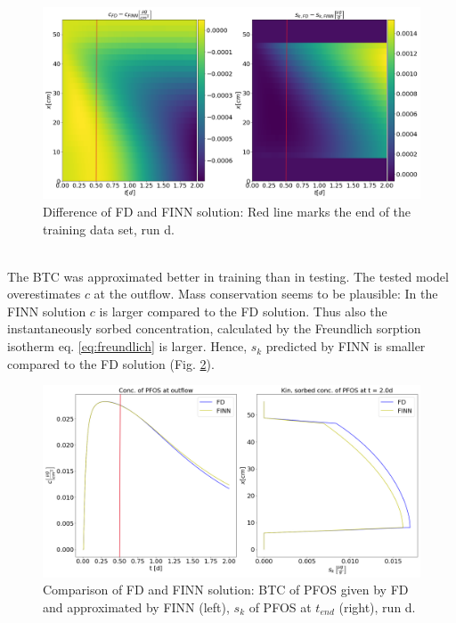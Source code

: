 \begin{figure}[h!]
	\centering
	\includegraphics[width=\textwidth]{images/res_diff_synt_F_m.png}
\caption[Difference of FD and FINN solution, run d]{Difference of FD and FINN solution: Red line marks the end of the training data set, run d.}
\label{fig:res_diff_synt_F_m}
\end{figure}\\
The BTC was approximated better in training than in testing. The tested model overestimates $c$ at the outflow. Mass conservation seems to be plausible: In the FINN solution $c$ is larger compared to the FD solution. Thus also the instantaneously sorbed concentration, calculated by the Freundlich sorption isotherm eq. \ref{eq:freundlich} is larger. Hence, $s_k$ predicted by FINN is smaller compared to the FD solution (Fig. \ref{fig:res_btc_synt_F_m}).
\begin{figure}[h!]
	\centering
	\includegraphics[width=\textwidth]{images/res_btc_synt_F_m.png}
\caption[Comparison of FD and FINN BTC, run d]{Comparison of FD and FINN solution: BTC of PFOS given by FD and approximated by FINN (left), $s_k$ of PFOS at $t_{end}$ (right), run d.}
\label{fig:res_btc_synt_F_m}
\end{figure}\\
